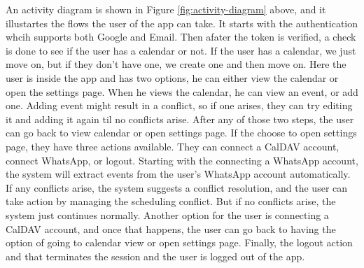 An activity diagram is shown in Figure \ref{fig:activity-diagram} above, and it illustartes the flows the user of the app can take. It starts with the authentication whcih supports both Google and Email. Then afater the token is verified, a check is done to see if the user has a calendar or not. If the user has a calendar, we just move on, but if they don't have one, we create one and then move on. Here the user is inside the app and has two options, he can either view the calendar or open the settings page. When he views the calendar, he can view an event, or add one. Adding event might result in a conflict, so if one arises, they can try editing it and adding it again til no conflicts arise. After any of those two steps, the user can go back to view calendar or open settings page. If the choose to open settings page, they have three actions available. They can connect a CalDAV account, connect WhatsApp, or logout. Starting with the connecting a WhatsApp account, the system will extract events from the user's WhatsApp account automatically. If any conflicts arise, the system suggests a conflict resolution, and the user can take action by managing the scheduling conflict. But if no conflicts arise, the system just continues normally. Another option for the user is connecting a CalDAV account, and once that happens, the user can go back to having the option of going to calendar view or open settings page. Finally, the logout action and that terminates the session and the user is logged out of the app.

